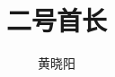 \documentclass[12pt,oneside]{book}
\begin{document}
\title{二号首长}
\author{黄晓阳}

\makemytitleA
\end{document}
